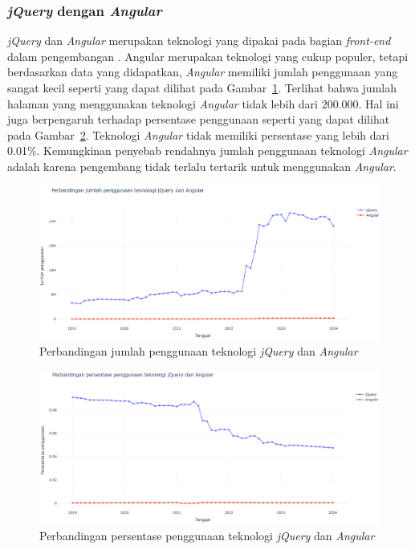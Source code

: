 \subsubsection{\textit{jQuery} dengan \textit{Angular}}
\label{subsubsec:angularjq}

\textit{jQuery} dan \textit{Angular} merupakan teknologi yang dipakai pada bagian \textit{front-end} dalam pengembangan \web. Angular merupakan teknologi yang cukup populer, tetapi berdasarkan data yang didapatkan, \textit{Angular} memiliki jumlah penggunaan yang sangat kecil seperti yang dapat dilihat pada Gambar~\ref{fig:angularjq}. Terlihat bahwa jumlah halaman \web yang menggunakan teknologi \textit{Angular} tidak lebih dari 200.000. Hal ini juga berpengaruh terhadap persentase penggunaan seperti yang dapat dilihat pada Gambar~\ref{fig:angularjqpersen}. Teknologi \textit{Angular} tidak memiliki persentase yang lebih dari 0.01\%. Kemungkinan penyebab rendahnya jumlah penggunaan teknologi \textit{Angular} adalah karena pengembang tidak terlalu tertarik untuk menggunakan \textit{Angular}.

\begin{figure}[H]
    \centering
    \includegraphics[width=0.7\linewidth]{Gambar/perbandinganangularjq.png}
    \caption{Perbandingan jumlah penggunaan teknologi \textit{jQuery} dan \textit{Angular}}
    \label{fig:angularjq}
\end{figure}

\begin{figure}[H]
    \centering
    \includegraphics[width=0.7\linewidth]{Gambar/angularjqpersen.png}
    \caption{Perbandingan persentase penggunaan teknologi \textit{jQuery} dan \textit{Angular}}
    \label{fig:angularjqpersen}
\end{figure}